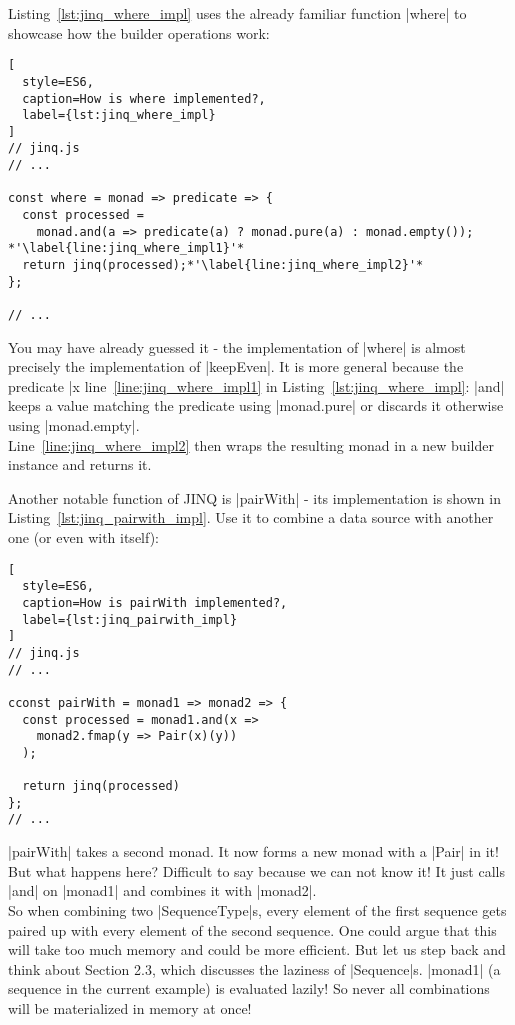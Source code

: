 Listing~\ref{lst:jinq_where_impl} uses the already familiar function |where| to
showcase how the builder operations work:

\begin{lstlisting}[
  style=ES6,
  caption=How is where implemented?,
  label={lst:jinq_where_impl}
]
// jinq.js
// ...

const where = monad => predicate => {
  const processed = 
    monad.and(a => predicate(a) ? monad.pure(a) : monad.empty()); *'\label{line:jinq_where_impl1}'*
  return jinq(processed);*'\label{line:jinq_where_impl2}'*
};

// ...
\end{lstlisting}

You may have already guessed it - the implementation of |where| is almost
precisely the implementation of |keepEven|. It is more general because the
predicate |x %
line~\ref{line:jinq_where_impl1} in Listing~\ref{lst:jinq_where_impl}: |and|
keeps a value matching the predicate using |monad.pure| or discards it
otherwise using |monad.empty|.\\
Line~\ref{line:jinq_where_impl2} then wraps the resulting monad in a new
builder instance and returns it.

Another notable function of JINQ is |pairWith| - its implementation is shown in
Listing~\ref{lst:jinq_pairwith_impl}. Use it to combine a data source with
another one (or even with itself):

\begin{lstlisting}[
  style=ES6,
  caption=How is pairWith implemented?,
  label={lst:jinq_pairwith_impl}
]
// jinq.js
// ...

cconst pairWith = monad1 => monad2 => {
  const processed = monad1.and(x =>
    monad2.fmap(y => Pair(x)(y))
  );

  return jinq(processed)
};
// ...
\end{lstlisting}

|pairWith| takes a second monad. It now forms a new monad with a |Pair| in it!
But what happens here? Difficult to say because we can not know it! It just
calls |and| on |monad1| and combines it with |monad2|. \\
So when combining two |SequenceType|s, every element of the first sequence gets
paired up with every element of the second sequence. One could argue that this
will take too much memory and could be more efficient. But let us step back and
think about Section 2.3, which discusses the laziness of |Sequence|s. |monad1|
(a sequence in the current example) is evaluated lazily! So never all
combinations will be materialized in memory at once!

